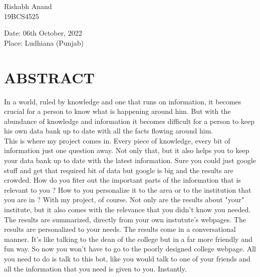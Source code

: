 \documentclass[14pt]{extarticle}
\begin{document}
\vspace{5em}
\begin{flushright}
    Rishabh Anand\\
    19BCS4525
\end{flushright}

\vspace{13em}
Date: 06th October, 2022 \\

Place: Ludhiana (Punjab)\\


\newpage
\begin{center}
    \tableofcontents
\end{center}

\newpage
{}
\listoffigures

\newpage
{}
\section*{ABSTRACT}
\onehalfspacing
\setlength{\parskip}{0em}

In a world, ruled by knowledge and one that runs on information, it becomes crucial for a person to know what is happening around him. But with the abundance of knowledge and information it becomes difficult for a person to keep his own data bank up to date with all the facts flowing around him. \\

This is where my project comes in. Every piece of knowledge, every bit of information just one question away. Not only that, but it also helps you to keep your data bank up to date with the latest information. Sure you could just google stuff and get that required bit of data but google is big and the results are crowded. How do you fiter out the important parts of the information that is relevant to you ? How to you personalize it to the area or to the institution that you are in ? With my project, of course. Not only are the results about "your" institute, but it also comes with the relevance that you didn't know you needed. \\

The results are summarized, directly from your own instutute's webpages. The results are personalized to your needs. The results come in a conversational manner. It's like talking to the dean of the college but in a far more friendly and fun way. So now you won't have to go to the poorly designed college webpage. All you need to do is talk to this bot, like you would talk to one of your friends and all the information that you need is given to you. Instantly.\\
\end{document}
